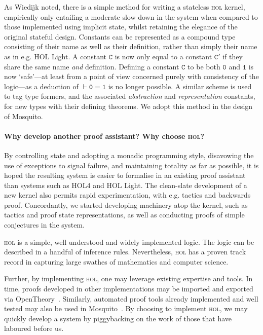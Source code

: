 \documentclass{llncs}
\newcommand{\mosquito}{Mosquito\xspace}
\begin{document}
As Wiedijk noted, there is a simple method for writing a stateless \textsc{hol} kernel, empirically only entailing a moderate slow down in the system when compared to those implemented using implicit state, whilst retaining the elegance of the original stateful design.
Constants can be represented as a compound type consisting of their name as well as their definition, rather than simply their name as in e.g. HOL Light.
A constant $\mathtt{C}$ is now only equal to a constant $\mathtt{C'}$ if they share the same name \emph{and} definition.
Defining a constant $\mathtt{C}$ to be both $\mathtt{0}$ and $\mathtt{1}$ is now `safe'---at least from a point of view concerned purely with consistency of the logic---as a deduction of $\vdash \mathtt{0 = 1}$ is no longer possible.
A similar scheme is used to tag type formers, and the associated \emph{abstraction} and \emph{representation} constants, for new types with their defining theorems.
We adopt this method in the design of \mosquito.

\paragraph{Why develop another proof assistant?  Why choose \textsc{hol}?}
By controlling state and adopting a monadic programming style, disavowing the use of exceptions to signal failure, and maintaining totality as far as possible, it is hoped the resulting system is easier to formalise in an existing proof assistant than systems such as HOL4 and HOL Light.
The clean-slate development of a new kernel also permits rapid experimentation, with e.g. tactics and backwards proof.
Concordantly, we started developing machinery atop the kernel, such as tactics and proof state representations, as well as conducting proofs of simple conjectures in the system.

\textsc{hol} is a simple, well understood and widely implemented logic.
The logic can be described in a handful of inference rules.
Nevertheless, \textsc{hol} has a proven track record in capturing large swathes of mathematics and computer science.

Further, by implementing \textsc{hol}, one may leverage existing expertise and tools.
In time, proofs developed in other implementations may be imported and exported via OpenTheory~\cite{hurd:opentheory:2011}.
Similarly, automated proof tools already implemented and well tested may also be used in \mosquito~\cite{kumar:standalone:2012}.
By choosing to implement \textsc{hol}, we may quickly develop a system by piggybacking on the work of those that have laboured before us.
\end{document}
